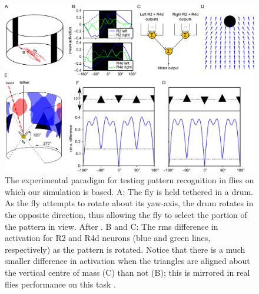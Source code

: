 \begin{figure}
\centering
\includegraphics{figures/recap}
\caption{The experimental paradigm for testing pattern recognition in flies on which our simulation is based.
A: The fly is held tethered in a drum. As the fly attempts to rotate about its yaw-axis, the drum rotates in the opposite direction, thus allowing the fly to select the portion of the pattern in view. After \protect\cite{Ernst1999}.
B and C: The \ac{rms} difference in activation for R2 and R4d neurons (blue and green lines, respectively) as the pattern is rotated. Notice that there is a much smaller difference in activation when the triangles are aligned about the vertical centre of mass (C) than not (B); this is mirrored in real flies performance on this task \protect\cite{Ernst1999}.}
\label{fig:recap}
\end{figure}
